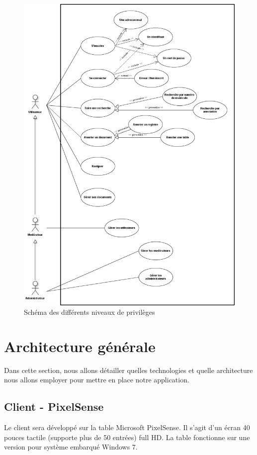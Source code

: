 \documentclass[a4paper]{article}
\begin{document}
\begin{figure}[H]
\centering
\includegraphics[width=\textwidth]{UseCaseDiagram.png}
\caption{Schéma des différents niveaux de privilèges}
\label{fig:privileges}
\end{figure}



\newpage
\section{Architecture générale}
Dans cette section, nous allons détailler quelles technologies et quelle architecture nous allons employer pour mettre en place notre application.

\subsection{Client - PixelSense}
Le client sera développé sur la table Microsoft PixelSense. Il s'agit d'un écran 40 pouces tactile (supporte plus de 50 entrées) full HD. La table fonctionne sur une version pour système embarqué Windows 7. 
\end{document}
